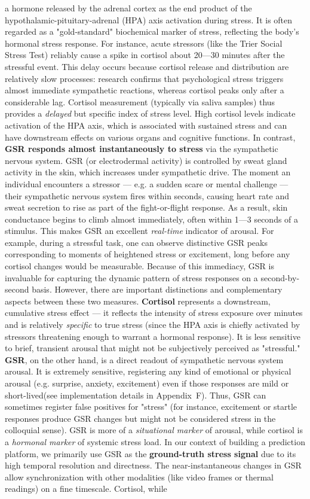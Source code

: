 a hormone released by the adrenal cortex as the end product of the hypothalamic-pituitary-adrenal (HPA) axis activation during stress. It is often regarded as a "gold-standard" biochemical marker of stress, reflecting the body's hormonal stress response. For instance, acute stressors (like the Trier Social Stress Test) reliably cause a spike in cortisol about 20---30 minutes after the stressful event. This delay occurs because cortisol release and distribution are relatively slow processes: research confirms that psychological stress triggers almost immediate sympathetic reactions, whereas cortisol peaks only after a considerable lag. Cortisol measurement (typically via saliva samples) thus provides a \textit{delayed} but specific index of stress level. High cortisol levels indicate activation of the HPA axis, which is associated with sustained stress and can have downstream effects on various organs and cognitive functions. In contrast, \textbf{GSR responds almost instantaneously to stress} via the sympathetic nervous system. GSR (or electrodermal activity) is controlled by sweat gland activity in the skin, which increases under sympathetic drive. The moment an individual encounters a stressor --- e.g. a sudden scare or mental challenge --- their sympathetic nervous system fires within seconds, causing heart rate and sweat secretion to rise as part of the fight-or-flight response. As a result, skin conductance begins to climb almost immediately, often within 1---3 seconds of a stimulus. This makes GSR an excellent \textit{real-time} indicator of arousal. For example, during a stressful task, one can observe distinctive GSR peaks corresponding to moments of heightened stress or excitement, long before any cortisol changes would be measurable. Because of this immediacy, GSR is invaluable for capturing the dynamic pattern of stress responses on a second-by-second basis. However, there are important distinctions and complementary aspects between these two measures. \textbf{Cortisol} represents a downstream, cumulative stress effect --- it reflects the intensity of stress exposure over minutes and is relatively \textit{specific} to true stress (since the HPA axis is chiefly activated by stressors threatening enough to warrant a hormonal response). It is less sensitive to brief, transient arousal that might not be subjectively perceived as "stressful." \textbf{GSR}, on the other hand, is a direct readout of sympathetic nervous system arousal. It is extremely sensitive, registering any kind of emotional or physical arousal (e.g. surprise, anxiety, excitement) even if those responses are mild or short-lived(see implementation details in Appendix~F). Thus, GSR can sometimes register false positives for "stress" (for instance, excitement or startle responses produce GSR changes but might not be considered stress in the colloquial sense). GSR is more of a \textit{situational marker} of arousal, while cortisol is a \textit{hormonal marker} of systemic stress load. In our context of building a prediction platform, we primarily use GSR as the \textbf{ground-truth stress signal} due to its high temporal resolution and directness. The near-instantaneous changes in GSR allow synchronization with other modalities (like video frames or thermal readings) on a fine timescale. Cortisol, while 